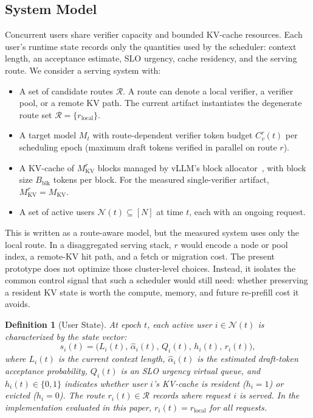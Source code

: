 \documentclass[journal]{IEEEtran}
\newtheorem{definition}{Definition}
\begin{document}
\subsection{System Model}
\label{sec:model-system}

Concurrent users share verifier capacity and bounded KV-cache
resources. Each user's runtime state records only the quantities used
by the scheduler: context length, an acceptance estimate, SLO urgency,
cache residency, and the serving route. We consider a serving system
with:

\begin{itemize}
    \item A set of candidate routes $\mathcal{R}$. A route can denote a
    local verifier, a verifier pool, or a remote KV path. The current
    artifact instantiates the degenerate route set
    $\mathcal{R}=\{r_{\mathrm{local}}\}$.

    \item A target model $M_t$ with route-dependent verifier token
    budget $C_v^{r}(t)$ per scheduling epoch (maximum draft tokens
    verified in parallel on route $r$).
    
    \item A KV-cache of $M_{\text{KV}}^r$ blocks managed by 
    vLLM's block allocator~\cite{kwon2023efficient}, with 
    block size $B_{\text{blk}}$ tokens per block. For the measured
    single-verifier artifact, $M_{\text{KV}}^r=M_{\text{KV}}$.
    
    \item A set of active users 
    $\mathcal{N}(t) \subseteq [N]$ at time $t$, 
    each with an ongoing request.
\end{itemize}

This is written as a route-aware model, but the measured system uses
only the local route. In a disaggregated serving stack, $r$ would encode
a node or pool index, a remote-KV hit path, and a fetch or migration
cost. The present prototype does not optimize those cluster-level
choices. Instead, it isolates the common control signal that such a
scheduler would still need: whether preserving a resident KV state is
worth the compute, memory, and future re-prefill cost it avoids.

\begin{definition}[User State]
At epoch $t$, each active user $i \in \mathcal{N}(t)$ is 
characterized by the state vector:
\begin{equation}
    s_i(t) = \bigl(L_i(t), \,
    \hat{\alpha}_{i}(t), \,
    Q_i(t), \,
    h_i(t), \,
    r_i(t)\bigr),
\end{equation}
where $L_i(t)$ is the current context length, 
$\hat{\alpha}_{i}(t)$ is the estimated draft-token acceptance
probability, $Q_i(t)$ is an SLO urgency virtual queue, and 
$h_i(t) \in \{0,1\}$ indicates whether user $i$'s 
KV-cache is resident ($h_i=1$) or evicted ($h_i=0$). The route
$r_i(t)\in\mathcal{R}$ records where request $i$ is served. In the
implementation evaluated in this paper, $r_i(t)=r_{\mathrm{local}}$
for all requests.
\end{definition}
\end{document}
